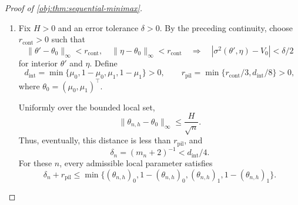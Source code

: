 \documentclass[11pt]{article}
\begin{document}
\begin{proof}[Proof of \cref{obj:thm:sequential-minimax}]
\begin{enumerate}
Subtracting the diagonal second-moment identity from the definition of \(\sigma^2\) gives the exact expression
\[
\begin{aligned}
\sigma^2(\theta',\eta)-V^*(\eta,p,\varepsilon)
&=
\sum_S
\alpha_{\eta,S}\bigl(h_S(\theta')-h_S(\eta)\bigr)
\phi_\eta(S)^2\\
&\qquad-
\bigl(\tau(\theta')-\tau(\eta)\bigr)^2.
\end{aligned}
\]
Using \(0\le\alpha_{\eta,S}\le1\) and \(|\phi_\eta(S)|\le C_\phi\), we obtain
\[
\begin{aligned}
|\sigma^2(\theta',\eta)-V^*(\eta,p,\varepsilon)|
&\le
C_\phi^2\sum_S|h_S(\theta')-h_S(\eta)|\\
&\qquad+
\bigl(\tau(\theta')-\tau(\eta)\bigr)^2.
\end{aligned}
\]
The right-hand side tends to zero as
\((\theta',\eta)\to(\theta_0,\theta_0)\). Hence
\[
\sigma^2(\theta',\eta)\longrightarrow V_0
\quad\text{as }(\theta',\eta)\to(\theta_0,\theta_0).
\]

\item
Fix \(H>0\) and an error tolerance \(\delta>0\). By the preceding continuity, choose \(r_{\mathrm{cont}}>0\) such that
\[
\|\theta'-\theta_0\|_\infty<r_{\mathrm{cont}},
\quad
\|\eta-\theta_0\|_\infty<r_{\mathrm{cont}}
\quad\Longrightarrow\quad
|\sigma^2(\theta',\eta)-V_0|<\delta/2
\]
for interior \(\theta'\) and \(\eta\). Define
\[
d_{\mathrm{int}}
=
\min\{\mu_0,1-\mu_0,\mu_1,1-\mu_1\}>0,
\qquad
r_{\mathrm{pil}}
=
\min\{r_{\mathrm{cont}}/3,d_{\mathrm{int}}/8\}>0,
\]
where \(\theta_0=(\mu_0,\mu_1)^\top\).

Uniformly over the bounded local set,
\[
\|\theta_{n,h}-\theta_0\|_\infty
\le\frac H{\sqrt n}.
\]
Thus, eventually, this distance is less than \(r_{\mathrm{pil}}\), and
\[
\delta_n=(m_n+2)^{-1}<d_{\mathrm{int}}/4.
\]
For these \(n\), every admissible local parameter satisfies
\[
\delta_n+r_{\mathrm{pil}}
\le
\min\{
(\theta_{n,h})_0,1-(\theta_{n,h})_0,
(\theta_{n,h})_1,1-(\theta_{n,h})_1
\}.
\]


\end{enumerate}
\end{proof}
\end{document}
